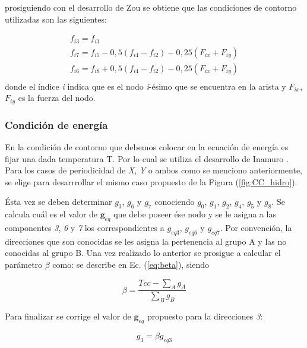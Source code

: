 prosiguiendo con el desarrollo de Zou \cite{zou1997pressure} se obtiene que las condiciones de contorno utilizadas son las siguientes:

\begin{equation}
	\begin{array}{c}
	f_{i3} = f_{i1}\\
	f_{i7} = f_{i5} - 0,5 (f_{i4} - f_{i2}) - 0,25 (F_{ix} + F_{iy})\\
	f_{i6} = f_{i8} + 0,5 (f_{i4} - f_{i2}) - 0,25 (F_{ix} + F_{iy})\\
	\end{array}
\end{equation}
\fi
donde el índice \textit{i} indica que es el nodo \textit{i}-ésimo que se encuentra en la arista y $F_{ix}$, $F_{iy}$ es la fuerza del nodo. 


\subsubsection{Condición de energía}


En la condición de contorno que debemos colocar en la ecuación de energía es fijar una dada temperatura T. Por lo cual se utiliza el desarrollo de Inamuro \cite{inamuro2002lattice}. Para los casos de periodicidad de \textit{X}, \textit{Y} o ambos como se menciono anteriormente, se elige para desarrrollar el mismo caso propuesto de la Figura (\ref{fig:CC_hidro}).

Ésta vez se deben determinar $g_{3}$, $g_{6}$ y $g_{7}$ conociendo $g_{0}$, $g_{1}$, $g_{2}$, $g_{4}$, $g_{5}$ y $g_{8}$. Se calcula cuál es el valor de $\mathbf{g}_{eq}$ que debe poseer ése nodo y se le asigna a las componentes \textit{3}, \textit{6} y \textit{7} los correspondientes a $g_{eq 3}$, $g_{eq 6}$ y $g_{eq 7}$. Por convención, la direcciones que son conocidas se les asigna la pertenencia al grupo A y las no conocidas al grupo B.
Una vez realizado lo anterior se prosigue a calcular el parámetro $\beta$ como:  se describe en Ec. (\ref{eq:beta}), siendo 

\begin{equation}
	\beta = \frac{Tcc - \sum_{A} g_{A}}{\sum_{B} g_{B}}
	\label{eq:beta}
\end{equation}

Para finalizar se corrige el valor de $\mathbf{g}_{eq}$ propuesto para la direcciones \textit{3}:

\begin{equation}
	g_{3} = \beta g_{eq 3}
\end{equation}


